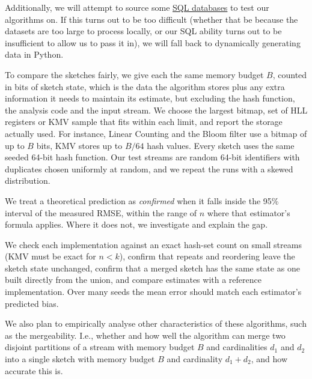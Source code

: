 Additionally, we will attempt to source some \hyperref[rahn2016]{SQL databases} to test our algorithms on. If this turns out to be too difficult (whether that be because the datasets are too large to process locally, or our SQL ability turns out to be insufficient to allow us to pass it in), we will fall back to dynamically generating data in Python.

To compare the sketches fairly, we give each the same memory budget $B$, counted in bits of sketch state, which is the data the algorithm stores plus any extra information it needs to maintain its estimate, but excluding the hash function, the analysis code and the input stream. We choose the largest bitmap, set of HLL registers or KMV sample that fits within each limit, and report the storage actually used. For instance, Linear Counting and the Bloom filter use a bitmap of up to $B$ bits, KMV stores up to $B/64$ hash values. Every sketch uses the same seeded 64-bit hash function. Our test streams are random 64-bit identifiers with duplicates chosen uniformly at random, and we repeat the runs with a skewed distribution.

We treat a theoretical prediction as \textsl{confirmed} when it falls inside the 95\% interval of the measured RMSE, within the range of $n$ where that estimator's formula applies. Where it does not, we investigate and explain the gap.

We check each implementation against an exact hash-set count on small streams (KMV must be exact for $n<k$), confirm that repeats and reordering leave the sketch state unchanged, confirm that a merged sketch has the same state as one built directly from the union, and compare estimates with a reference implementation. Over many seeds the mean error should match each estimator's predicted bias.

We also plan to empirically analyse other characteristics of these algorithms, such as the mergeability. I.e., whether and how well the algorithm can merge two disjoint partitions of a stream with memory budget $B$ and cardinalities $d_1$ and $d_2$ into a single sketch with memory budget $B$ and cardinality $d_1 + d_2$, and how accurate this is.




